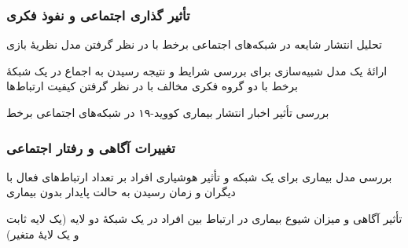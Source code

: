 \documentclass[xcolor=dvipsnames, professionalfonts, aspectratio=169, 11pt]{beamer}
\begin{document}
\begin{frame}
    \frametitle{تأثیر گذاری اجتماعی و نفوذ فکری}

    \begin{moredi}
        \item تحلیل انتشار شایعه در شبکه‌های اجتماعی برخط با در نظر گرفتن مدل نظریهٔ بازی \cite{huang2020developing}
        \item ارائهٔ یک مدل شبیه‌سازی برای بررسی شرایط و نتیجه رسیدن به اجماع  در یک شبکهٔ برخط با دو گروه فکری مخالف با در نظر گرفتن کیفیت ارتباط‌ها \cite{bolzern2020opinion,nettasinghe2019diffusion}
        \item بررسی تأثیر اخبار انتشار بیماری کووید-۱۹ در شبکه‌های اجتماعی برخط \cite{cinelli2020covid}
    \end{moredi}

\end{frame}

\begin{frame}
    \frametitle{تغییرات آگاهی و رفتار اجتماعی}

    \begin{moredi}
        \item بررسی مدل بیماری  برای یک شبکه و تأثیر هوشیاری افراد بر تعداد ارتباط‌های فعال با دیگران و زمان رسیدن به حالت پایدار بدون بیماری \cite{li2019control,bhowmick2020influence}
        \item تأثیر آگاهی و میزان شیوع بیماری در ارتباط بین افراد در یک شبکهٔ دو لایه (یک لایه ثابت و یک لایهٔ متغیر)\cite{sahneh2019contact}
    \end{moredi}

\end{frame}
\end{document}
